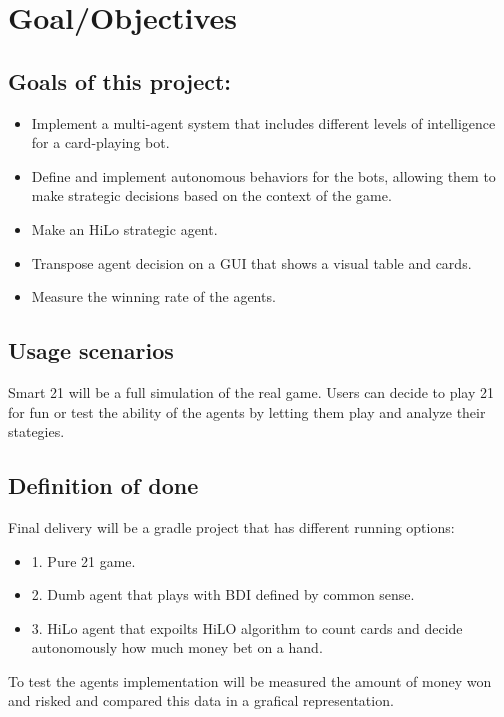 \chapter{Goal/Objectives}
\label{ch:goal} %
\section{Goals of this project:}
\begin{itemize}
    \item Implement a multi-agent system that includes different levels of intelligence for a card-playing bot.
    \item Define and implement autonomous behaviors for the bots, allowing them to make strategic decisions based on the context of the game.
    \item Make an HiLo strategic agent.
    \item Transpose agent decision on a GUI that shows a visual table and cards.
    \item Measure the winning rate of the agents.
\end{itemize}

\section{Usage scenarios}

Smart 21 will be a full simulation of the real game. Users can decide to play 21 for fun or test the ability of the agents by letting them play and analyze their stategies.  

\section{Definition of done}

Final delivery will be a gradle project that has different running options:

\begin{itemize}
    \item 1. Pure 21 game.
    \item 2. Dumb agent that plays with BDI defined by common sense.
    \item 3. HiLo agent that expoilts HiLO algorithm to count cards and decide autonomously how much money bet on a hand.
\end{itemize}

To test the agents implementation will be measured the amount of money won and risked and compared this data in a grafical representation.
